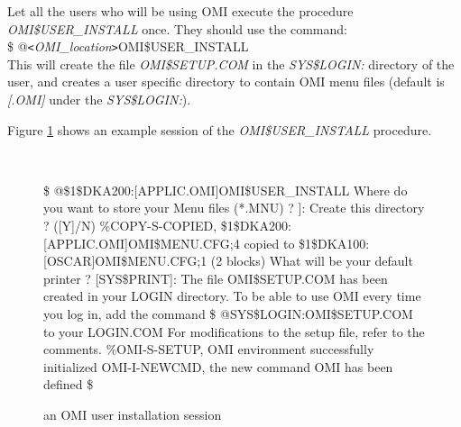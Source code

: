 \documentclass[a4paper]{book}
\newcommand{\vs}{\vspace{3mm}}
\newcommand{\lt}{\texttt{<}}
\newcommand{\gt}{\texttt{>}}
\renewcommand{\indent}{\hspace*{5mm}}
\begin{document}
Let all the users who will be using OMI execute the procedure
\linebreak\textsl{OMI{\$}USER{\_}INSTALL} once. They should use the command: \\
\indent\textsf{{\$} @\lt\textit{OMI{\_}location}\gt OMI{\$}USER{\_}INSTALL} \\
This will create the file \textsl{OMI{\$}SETUP.COM} in the \textsl{SYS{\$}LOGIN:} directory of 
the user, and creates a user specific directory to contain OMI menu files 
(default is \textsl{[.OMI]} under the \textsl{SYS{\$}LOGIN:}).

Figure \ref{fig:userinst} shows an example session of the \textsl{OMI{\$}USER{\_}INSTALL}
procedure.

\vs

\begin{figure}[ht]
\begin{minipage}[t]{\textwidth}
\hrulefill \\
\begin{ttfamily}\begin{small}
{\$} @{\$}1{\$}DKA200:[APPLIC.OMI]OMI{\$}USER{\_}INSTALL \newline
Where do you want to store your Menu files (*.MNU) ? \newline
[{\$}1{\$}DKA100:[OSCAR.OMI]]: \newline
Create this directory ? ([Y]/N) \newline
{\%}COPY-S-COPIED, {\$}1{\$}DKA200:[APPLIC.OMI]OMI{\$}MENU.CFG;4 copied to {\$}1{\$}DKA100:[OSCAR]OMI{\$}MENU.CFG;1 (2 blocks) \newline
What will be your default printer ? [SYS{\$}PRINT]:\newline
The file OMI{\$}SETUP.COM has been created in your LOGIN directory. \newline
To be able to use OMI every time you log in, add the command \newline
{\$} @SYS{\$}LOGIN:OMI{\$}SETUP.COM \newline
to your LOGIN.COM \newline
For modifications to the setup file, refer to the comments.\newline
{\%}OMI-S-SETUP, OMI environment successfully initialized \newline
OMI-I-NEWCMD, the new command OMI has been defined \newline
{\$}
\end{small}\end{ttfamily}
\caption{an OMI user installation session}\label{fig:userinst}
\hrulefill
\end{minipage}
\end{figure}
\end{document}
